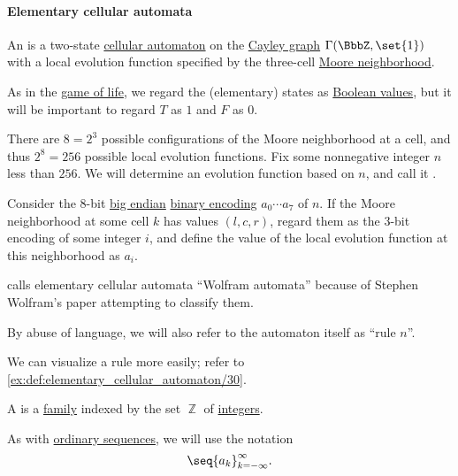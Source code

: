 \paragraph{Elementary cellular automata}

\begin{definition}\label{def:elementary_cellular_automaton}
  An  is a two-state \hyperref[def:cellular_automaton]{cellular automaton} on the \hyperref[def:cayley_graph]{Cayley graph} \( \Gamma(\BbbZ, \set{ 1 }) \) with a local evolution function specified by the three-cell \hyperref[def:cayley_graph_neighborhood/moore]{Moore neighborhood}.

  As in the \hyperref[def:game_of_life]{game of life}, we regard the (elementary) states as \hyperref[con:boolean_value]{Boolean values}, but it will be important to regard \( T \) as \( 1 \) and \( F \) as \( 0 \).

  There are \( 8 = 2^3 \) possible configurations of the Moore neighborhood at a cell, and thus \( 2^8 = 256 \) possible local evolution functions. Fix some nonnegative integer \( n \) less than \( 256 \). We will determine an evolution function based on \( n \), and call it .

  Consider the \( 8 \)-bit \hyperref[def:endianness/big]{big endian} \hyperref[def:ring_of_unsigned_integers]{binary encoding} \( a_0 \cdots a_7 \) of \( n \). If the Moore neighborhood at some cell \( k \) has values \( (l, c, r) \), regard them as the \( 3 \)-bit encoding of some integer \( i \), and define the value of the local evolution function at this neighborhood as \( a_i \).
\end{definition}
\begin{comments}
  \item {} calls elementary cellular automata \enquote{Wolfram automata} because of Stephen Wolfram's paper \cite{Wolfram1983StatisticalMechanicsOfCellularAutomata} attempting to classify them.

  \item By abuse of language, we will also refer to the automaton itself as \enquote{rule \( n \)}.

  \item We can visualize a rule more easily; refer to \cref{ex:def:elementary_cellular_automaton/30}.
\end{comments}

\begin{definition}\label{def:doubly_infinite_sequence}
  A  is a \hyperref[def:indexed_family]{family} indexed by the set \( \BbbZ \) of \hyperref[def:integers]{integers}.

  As with \hyperref[def:sequence]{ordinary sequences}, we will use the notation
  \begin{equation*}
    \seq{ a_k }_{k=-\infty}^\infty.
  \end{equation*}
\end{definition}

